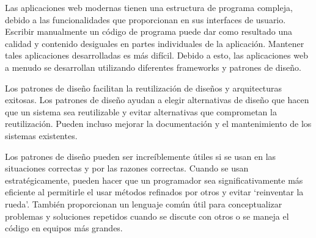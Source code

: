 Las aplicaciones web modernas tienen una estructura de programa compleja, debido a las funcionalidades que proporcionan en sus interfaces de usuario. Escribir manualmente un código de programa puede dar como resultado una calidad y contenido desiguales en partes individuales de la aplicación. Mantener tales aplicaciones desarrolladas es más difícil. Debido a esto, las aplicaciones web a menudo se desarrollan utilizando diferentes \glspl{framework} y patrones de diseño.
\vspace{0.8cm}

Los patrones de diseño facilitan la reutilización de diseños y arquitecturas exitosas. Los patrones de diseño ayudan a elegir alternativas de diseño que hacen que un sistema sea reutilizable y evitar alternativas que comprometan la reutilización. Pueden incluso mejorar la documentación y el mantenimiento de los sistemas existentes.
\vspace{0.8cm}

Los patrones de diseño pueden ser increíblemente útiles si se usan en las situaciones correctas y por las razones correctas. Cuando se usan estratégicamente, pueden hacer que un programador sea significativamente más eficiente al permitirle el usar métodos refinados por otros y evitar `reinventar la rueda'. También proporcionan un lenguaje común útil para conceptualizar problemas y soluciones repetidos cuando se discute con otros o se maneja el código en equipos más grandes.